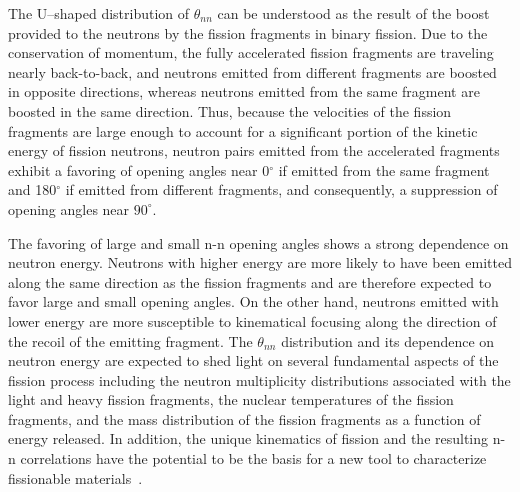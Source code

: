 The U--shaped distribution of $\theta_{nn}$ can be understood as the result of the boost provided to the neutrons by the fission fragments in binary fission.
Due to the conservation of momentum, the fully accelerated fission fragments are traveling nearly back-to-back, and neutrons emitted from different fragments are boosted in opposite directions, whereas neutrons emitted from the same fragment are boosted in the same direction.
Thus, because the velocities of the fission fragments are large enough to account for a significant portion of the kinetic energy of fission neutrons, neutron pairs emitted from the accelerated fragments exhibit a favoring of opening angles near 0$^{\circ}$ if emitted from the same fragment and 180$^{\circ}$ if emitted from different fragments, and consequently, a suppression of opening angles near $90^{\circ}$.

The favoring of large and small n-n opening angles shows a strong dependence on neutron energy.
Neutrons with higher energy are more likely to have been emitted along the same direction as the fission fragments and are therefore expected to favor large and small opening angles.
On the other hand, neutrons emitted with lower energy are more susceptible to kinematical focusing along the direction of the recoil of the emitting fragment.
The $\theta_{nn}$ distribution and its dependence on neutron energy are expected to shed light on several fundamental aspects of the fission process including the neutron multiplicity distributions associated with the light and heavy fission fragments, the nuclear temperatures of the fission fragments, and the mass distribution of the fission fragments as a function of energy released.
In addition, the unique kinematics of fission and the resulting n-n correlations have the potential to be the basis for a new tool to characterize fissionable materials~\cite{Talou2018}. %



